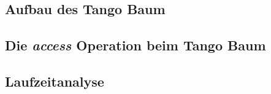\documentclass[a4paper,12pt]{article}
\begin{document}
\subsection{Aufbau des Tango Baum} \label{aufbauDesTango}
\subsection{Die \textit{access} Operation beim Tango Baum}
\subsection{Laufzeitanalyse}
\newpage


\end{document}

